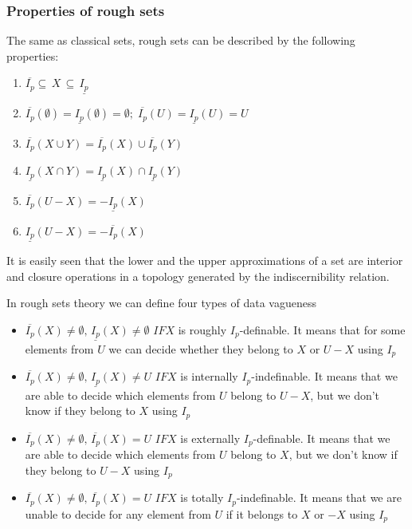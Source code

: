 \subsubsection{Properties of rough sets}
The same as classical sets, rough sets can be described by the
following properties:
\begin{enumerate}
    \item $\overline{I_p} \subseteq \, X \, \subseteq \, \underline{I_p}$
    \item $\overline{I_p}(\emptyset) = \underline{I_p}(\emptyset) = \emptyset;
        \;
        \overline{I_p}(U) = \underline{I_p}(U) = U $
    \item $\overline{I_p}(X \cup Y) = \overline{I_p}(X) \cup \overline{I_p}(Y)$
    \item $\underline{I_p}(X \cap Y) = \underline{I_p}(X) \cap \underline{I_p}(Y)$
    \item $\overline{I_p}(U-X) = -\underline{I_p}(X)$
    \item $\underline{I_p}(U-X) = -\overline{I_p}(X)$
\end{enumerate}
It is easily seen that the lower and the upper 
approximations of a set are interior and 
closure operations in a topology generated by the 
indiscernibility relation.

In rough sets theory we can define four types of data vagueness
\begin{itemize}
    \item $\overline{I_p}(X) \neq \emptyset,\, \underline{I_p}(X) \neq
        \emptyset$ $IF X$ is roughly $I_p$-definable. It means that for some
        elements from $U$ we can decide whether they belong to $X$ or $U-X$
        using $I_p$
    \item $\overline{I_p}(X) \neq \emptyset,\, \underline{I_p}(X) \neq U$ $IF
        X$ is internally $I_p$-indefinable. It means that we are able to decide
        which elements from $U$ belong to $U-X$, but we don't know if they
        belong to $X$ using $I_p$
    \item $\overline{I_p}(X) \neq \emptyset,\, \overline{I_p}(X) = U$ $IF
        X$ is externally $I_p$-definable. It means that we are able to decide
        which elements from $U$ belong to $X$, but we don't know if they belong
        to $U-X$ using $I_p$
    \item $\overline{I_p}(X) \neq \emptyset,\, \overline{I_p}(X) = U$ $IF
        X$ is totally $I_p$-indefinable. It means that we are unable to decide
        for any element from $U$ if it belongs to $X$ or $-X$ using $I_p$
\end{itemize}
